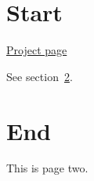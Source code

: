 \documentclass{article}
\begin{document}
\section{Start}
{\Huge \href{https://example.com/termleaf}{Project page}}

See section~\ref{sec:end}.
\newpage
\section{End}\label{sec:end}
This is page two.
\end{document}
